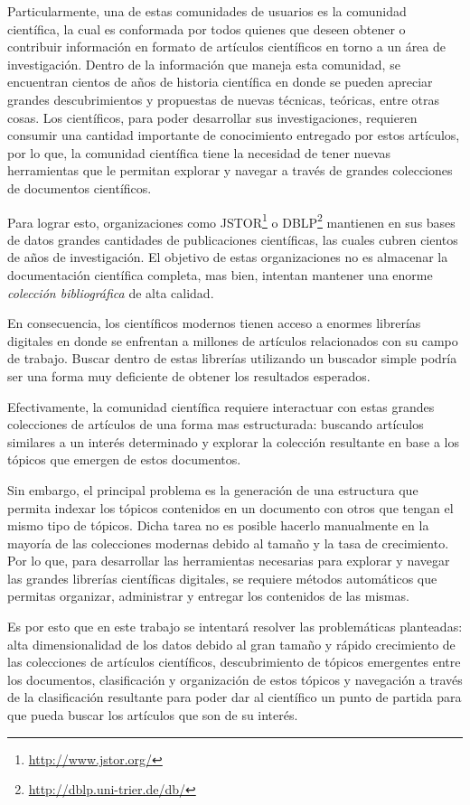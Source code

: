 \documentclass[12pt,oneside,letterpaper]{book}
\theoremstyle{definition}
\begin{document}
Particularmente, una de estas comunidades de usuarios es la comunidad científica, la cual es conformada por todos quienes que deseen obtener o contribuir información en formato de artículos científicos en torno a un área de investigación. Dentro de la información que maneja esta comunidad, se encuentran cientos de años de historia científica en donde se pueden apreciar grandes descubrimientos y propuestas de nuevas técnicas, teóricas, entre otras cosas. Los científicos, para poder desarrollar sus investigaciones, requieren consumir una cantidad importante de conocimiento entregado por estos artículos, por lo que, la comunidad científica tiene la necesidad de tener nuevas herramientas que le permitan explorar y navegar a través de grandes colecciones de documentos científicos.

Para lograr esto, organizaciones como JSTOR\footnote{\url{http://www.jstor.org/}} o DBLP\footnote{\url{http://dblp.uni-trier.de/db/}} mantienen en sus bases de datos grandes cantidades de publicaciones científicas, las cuales cubren cientos de años de investigación. El objetivo de estas organizaciones no es almacenar la documentación científica completa, mas bien, intentan mantener una enorme \emph{colección bibliográfica} de alta calidad.

En consecuencia, los científicos modernos tienen acceso a enormes librerías digitales en donde se enfrentan a millones de artículos relacionados con su campo de trabajo. Buscar dentro de estas librerías utilizando un buscador simple podría ser una forma muy deficiente de obtener los resultados esperados.

Efectivamente, la comunidad científica requiere interactuar con estas grandes colecciones de artículos de una forma mas estructurada: buscando artículos similares a un interés determinado y explorar la colección resultante en base a los tópicos que emergen de estos documentos.

Sin embargo, el principal problema es la generación de una estructura que permita indexar los tópicos contenidos en un documento con otros que tengan el mismo tipo de tópicos. Dicha tarea no es posible hacerlo manualmente en la mayoría de las colecciones modernas debido al tamaño y la tasa de crecimiento. Por lo que, para desarrollar las herramientas necesarias para explorar y navegar las grandes librerías científicas digitales, se requiere métodos automáticos que permitas organizar, administrar y entregar los contenidos de las mismas.

Es por esto que en este trabajo se intentará resolver las problemáticas planteadas: alta dimensionalidad de los datos debido al gran tamaño y rápido crecimiento de las colecciones de artículos científicos, descubrimiento de tópicos emergentes entre los documentos, clasificación y organización de estos tópicos y navegación a través de la clasificación resultante para poder dar al científico un punto de partida para que pueda buscar los artículos que son de su interés.
\end{document}
